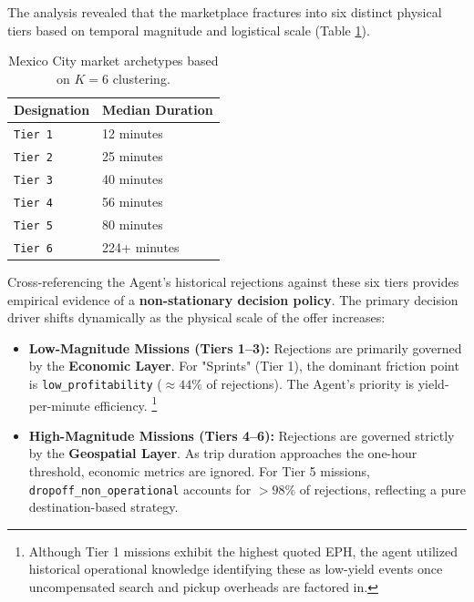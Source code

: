 The analysis revealed that the marketplace fractures into six distinct physical tiers based on temporal magnitude and logistical scale (Table \ref{tab:mission_tiers}). 

\begin{table}[H]
    \centering
    \small
    \begin{tabular}{l l}
        \toprule
        \textbf{Designation} & \textbf{Median Duration}\footnotemark \\
        \midrule
        \texttt{Tier 1} & 12 minutes \\
        \texttt{Tier 2} & 25 minutes \\
        \texttt{Tier 3} & 40 minutes \\
        \texttt{Tier 4} & 56 minutes \\
        \texttt{Tier 5} & 80 minutes \\
        \texttt{Tier 6} & 224+ minutes \\
        \bottomrule
    \end{tabular}
    \caption{Mexico City market archetypes based on $K=6$ clustering.} 
    \label{tab:mission_tiers} 
\end{table}

Cross-referencing the Agent's historical rejections against these six tiers provides empirical evidence of a \textbf{non-stationary decision policy}. The primary decision driver shifts dynamically as the physical scale of the offer increases:

\begin{itemize}[noitemsep, topsep=3pt]
    \item \textbf{Low-Magnitude Missions (Tiers 1--3):} Rejections are primarily governed by the \textbf{Economic Layer}. For "Sprints" (Tier 1), the dominant friction point is \texttt{low\_profitability} ($\approx 44\%$ of rejections). The Agent's priority is yield-per-minute efficiency. \footnote{Although Tier 1 missions exhibit the highest quoted EPH, the agent utilized historical operational knowledge identifying these as low-yield events once uncompensated search and pickup overheads are factored in.}
    \item \textbf{High-Magnitude Missions (Tiers 4--6):} Rejections are governed strictly by the \textbf{Geospatial Layer}. As trip duration approaches the one-hour threshold, economic metrics are ignored. For Tier 5 missions, \texttt{dropoff\_non\_operational} accounts for $>98\%$ of rejections, reflecting a pure destination-based strategy.
\end{itemize}

